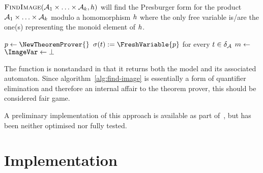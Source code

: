 \documentclass[acmsmall,review,anonymous,screen]{acmart}\settopmatter{printfolios=true,printccs=false,printacmref=true}
\theoremstyle{definition}
\begin{document}
  \begin{algorithm}
    \DontPrintSemicolon
    \caption{$\textsc{FindImage}{}(\mathcal{A}_1 \times \ldots \times \mathcal{A}_k, h)$ will find the Presburger form for the product $\mathcal{A}_1 \times \ldots \times \mathcal{A}_k$ modulo a homomorphism $h$ where the only free variable is/are the one(s) representing the monoid element of $h$.}\label{alg:find-image}
  
$p \gets \NewTheoremProver{}$\;
$\Filter(\Transition) := \FreshVariable{p}$ for every $t \in \delta_{\mathcal{A}}$\;
$m \gets$ \;
\;
$\ImageVar \gets \bot$\;
    \KwRet{\ImageVar}
    \end{algorithm}

    The \GetModel{} function is nonstandard in that it returns both the model
    and its associated automaton. Since algorithm~\ref{alg:find-image} is
    essentially a form of quantifier elimination and therefore an internal affair
    to the theorem prover, this should be considered fair game.
    
    A preliminary implementation of this approach is available as part
    of~\Catra, but has been neither optimised nor fully tested.

\section{Implementation}\label{sec:implementation}
\end{document}
